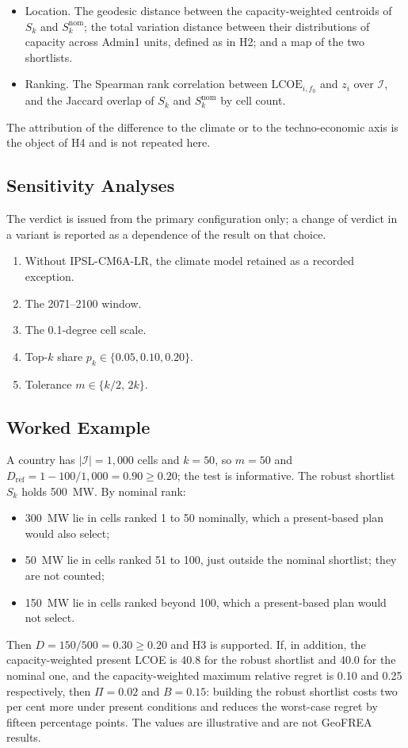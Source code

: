 \begin{itemize}
    \item Location. The geodesic distance between the capacity-weighted centroids
    of $S_k$ and $S^{\mathrm{nom}}_k$; the total variation distance between their
    distributions of capacity across Admin1 units, defined as in H2; and a map of
    the two shortlists.
    \item Ranking. The Spearman rank correlation between $\mathrm{LCOE}_{i,f_0}$
    and $z_i$ over $\mathcal{I}$, and the Jaccard overlap of $S_k$ and
    $S^{\mathrm{nom}}_k$ by cell count.
\end{itemize}

The attribution of the difference to the climate or to the techno-economic axis
is the object of H4 and is not repeated here.

\subsection{Sensitivity Analyses}
\label{subsec:h3_sensitivity}

The verdict is issued from the primary configuration only; a change of verdict
in a variant is reported as a dependence of the result on that choice.
\begin{enumerate}
    \item Without IPSL-CM6A-LR, the climate model retained as a recorded
    exception.
    \item The 2071--2100 window.
    \item The 0.1-degree cell scale.
    \item Top-$k$ share $p_k\in\{0.05,0.10,0.20\}$.
    \item Tolerance $m\in\{k/2,\,2k\}$.
\end{enumerate}

\subsection{Worked Example}
\label{subsec:h3_example}

A country has $|\mathcal{I}|=1{,}000$ cells and $k=50$, so $m=50$ and
$D_{\mathrm{ref}}=1-100/1{,}000=0.90\geq0.20$; the test is informative. The
robust shortlist $S_k$ holds 500~MW. By nominal rank:
\begin{itemize}
    \item 300~MW lie in cells ranked 1 to 50 nominally, which a present-based
    plan would also select;
    \item 50~MW lie in cells ranked 51 to 100, just outside the nominal
    shortlist; they are not counted;
    \item 150~MW lie in cells ranked beyond 100, which a present-based plan
    would not select.
\end{itemize}
Then $D=150/500=0.30\geq0.20$ and H3 is supported. If, in addition, the
capacity-weighted present LCOE is 40.8 for the robust shortlist and 40.0 for the
nominal one, and the capacity-weighted maximum relative regret is 0.10 and 0.25
respectively, then $\Pi=0.02$ and $B=0.15$: building the robust shortlist costs
two per cent more under present conditions and reduces the worst-case regret by
fifteen percentage points. The values are illustrative and are not GeoFREA
results.

